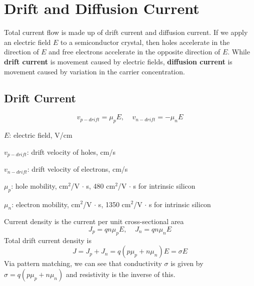 \chapter{Drift and Diffusion Current}
Total current flow is made up of drift current and diffusion current. If we apply an electric field $E$ to a semiconductor crystal, then holes accelerate in the direction of $E$ and free electrons accelerate in the opposite direction of $E$. While \textbf{drift current} is movement caused by electric fields, \textbf{diffusion current} is movement caused by variation in the carrier concentration. 

\section{Drift Current}
    \[v_{p-drift} = \mu_p E, ~~~~~ v_{n-drift} = - \mu_n E\]

\begin{gline}
    \item $E$: electric field, V/cm
    \item $v_{p-drift}$: drift velocity of holes, cm/s
    \item $v_{n-drift}$: drift velocity of electrons, cm/s
    \item $\mu_p$: hole mobility, cm$^2$/V $\cdot$ s, 480 cm$^2$/V $\cdot$ s for intrinsic silicon
    \item $\mu_n$: electron mobility, cm$^2$/V $\cdot$ s, 1350 cm$^2$/V $\cdot$ s for intrinsic silicon
\end{gline}

Current density is the current per unit cross-sectional area
    \[J_p = qn\mu_p E, ~~~~~ J_n = qn\mu_n E\]
Total drift current density is
    \[J = J_p + J_n = q(p\mu_p + n\mu_n) E = \sigma E\]
Via pattern matching, we can see that conductivity $\sigma$ is given by $\sigma = q(p\mu_p + n\mu_n)$ and resistivity is the inverse of this.

